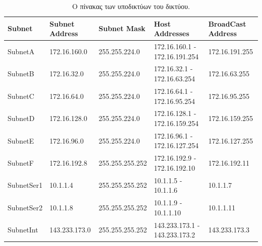 \documentclass{assignment}
\begin{document}
\begin{table}
\begin{center}
  \begin{tabular}{|m{2.3cm}|m{2.9cm}|m{3.5cm}|m{3.4cm}|m{3.3cm}|}
    \hline
    Subnet & Subnet Address & Subnet Mask & Host Addresses & BroadCast Address \\ \hline
  SubnetA & 172.16.160.0 & 255.255.224.0 & 172.16.160.1 - 172.16.191.254 & 172.16.191.255 \\ \hline
  SubnetB & 172.16.32.0 & 255.255.224.0 & 172.16.32.1 - 172.16.63.254 & 172.16.63.255 \\ \hline
  SubnetC & 172.16.64.0 & 255.255.224.0 & 172.16.64.1 - 172.16.95.254 & 172.16.95.255 \\ \hline
  SubnetD & 172.16.128.0 & 255.255.224.0 & 172.16.128.1 - 172.16.159.254 & 172.16.159.255 \\ \hline
  SubnetE & 172.16.96.0 & 255.255.224.0 & 172.16.96.1 - 172.16.127.254 & 172.16.127.255 \\ \hline
  SubnetF & 172.16.192.8 & 255.255.255.252 & 172.16.192.9 - 172.16.192.10 & 172.16.192.11 \\ \hline
  SubnetSer1 & 10.1.1.4 & 255.255.255.252 & 10.1.1.5 - 10.1.1.6 & 10.1.1.7 \\ \hline
  SubnetSer2 & 10.1.1.8 & 255.255.255.252 & 10.1.1.9 - 10.1.1.10 & 10.1.1.11 \\ \hline
  SubnetInt & 143.233.173.0 & 255.255.255.252 & 143.233.173.1 - 143.233.173.2 & 143.233.173.3 \\ \hline
  
  \end{tabular}
\caption{Ο πίνακας των υποδικτύων του δικτύου.}
\label{table:VLSM_subnetting}
\end{center}
\end{table}
\end{document}
